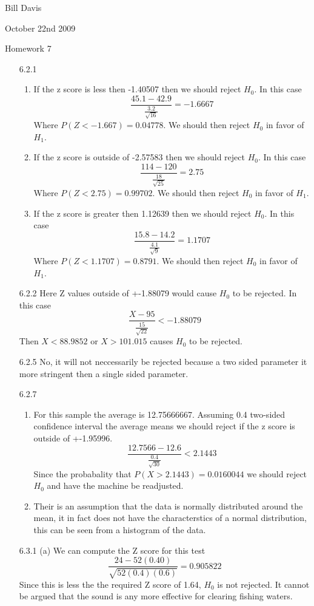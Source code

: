 \documentclass[11pt,fleqn]{article}
\begin{document}
\newcommand{\mbf}[1]{\mbox{{\bfseries #1}}}
\newcommand{\N}{\mbf{N}}
\renewcommand{\O}{\mbf{O}}
\newcommand{\tabfrac}[2]{%
	\setlength{\fboxrule}{0pt}%
	\fbox{$\frac{#1}{#2}$}%
}

\noindent Bill Davis 

\noindent October 22nd 2009 

\noindent Homework 7

\begin{enumerate}
 
\item[6.2.1]
\begin{enumerate}
  \item If the z score is less then -1.40507 then we should reject $H_0$. In
  this case 
  \[
  \displaystyle\frac{45.1-42.9}{\frac{3.2}{\sqrt{16}}} = -1.6667
  \]
  Where $P(Z<-1.667) = 0.04778$. We should then reject $H_0$ in favor of $H_1$.
  
    \item If the z score is outside of  -2.57583 then we should reject
    $H_0$. In this case 
  \[
  \displaystyle\frac{114-120}{\frac{18}{\sqrt{25}}} = 2.75
  \]
  Where $P(Z<2.75) = 0.99702$. We should then reject $H_0$ in favor of $H_1$.
  
      \item If the z score is greater then 1.12639 then we should reject $H_0$.
      In this case 
  \[
  \displaystyle\frac{15.8-14.2}{\frac{4.1}{\sqrt{9}}} = 1.1707
  \]
  Where $P(Z<1.1707) = 0.8791$. We should then reject $H_0$ in favor of $H_1$.
\end{enumerate}
\item[6.2.2]
Here Z values outside of +-1.88079 would cause $H_0$ to be rejected. In this
case 
\[
\frac{X-95}{\frac{15}{\sqrt{22}}} < -1.88079
\]
Then $X<88.9852$ or $X>101.015$ causes $H_0$ to be rejected.

\item[6.2.5]
No, it will not neccessarily be rejected because a two sided parameter it more
stringent then a single sided parameter. 

\item[6.2.7]
\begin{enumerate}
  \item
  For this sample the average is 12.75666667. Assuming 0.4
two-sided confidence interval the average means we should reject if the z score is outside of
+-1.95996.
\[
\frac{12.7566-12.6}{\frac{0.4}{\sqrt{30}}} < 2.1443
\]
Since the probabality that $P(X>2.1443) = 0.0160044 $ we should reject $H_0$
and have the machine be readjusted.
\item
Their is an assumption that the data is normally distributed around the mean,
it in fact does not have the characterstics of a normal distribution, this can
be seen from a histogram of the data. 
\end{enumerate} 
\item[6.3.1]
(a) We can compute the Z score for this test
\[
\frac{24-52(0.40)}{\sqrt{52(0.4)(0.6)}} = 0.905822
\]
Since this is less the the required Z score of  1.64, $H_0$ is not rejected. It
cannot be argued that the sound is any more effective for clearing fishing
waters. 


\end{enumerate}
\end{document}
